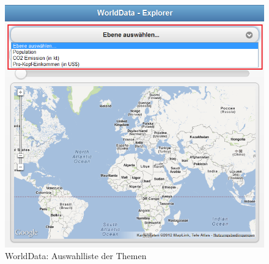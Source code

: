 \begin{figure}[H]
	\centering
	\includegraphics[scale=0.7]{images/usecase1-worlddata/documentation/worlddata-application_start.png}
	\caption{WorldData: Auswahlliste der Themen}
	\label{worlddata-application_start}
\end{figure}